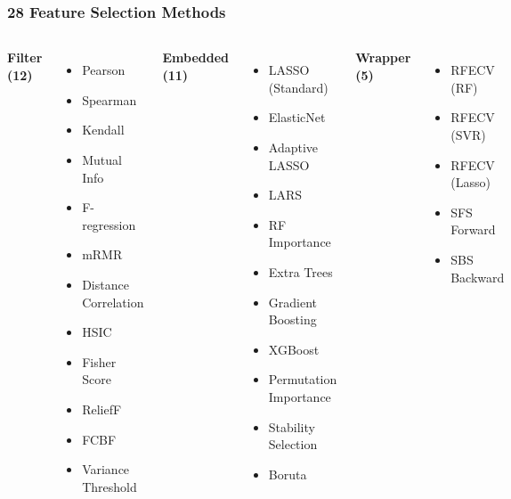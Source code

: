 \documentclass[aspectratio=169]{beamer}
\begin{document}
\begin{frame}
    \frametitle{28 Feature Selection Methods}
    \scriptsize
    \begin{columns}[T]
        \textbf{\textcolor{blue!70!black}{Filter (12)}}
        \begin{itemize}\setlength\itemsep{0em}
            \item Pearson
            \item Spearman
            \item Kendall
            \item Mutual Info
            \item F-regression
            \item mRMR
            \item Distance Correlation
            \item HSIC
            \item Fisher Score
            \item ReliefF
            \item FCBF
            \item Variance Threshold
        \end{itemize}
        \textbf{\textcolor{orange!80!black}{Embedded (11)}}
        \begin{itemize}\setlength\itemsep{0em}
            \item LASSO (Standard)
            \item ElasticNet
            \item Adaptive LASSO
            \item LARS
            \item RF Importance
            \item Extra Trees
            \item Gradient Boosting
            \item XGBoost
            \item Permutation Importance
            \item Stability Selection
            \item Boruta
        \end{itemize}
        \textbf{\textcolor{green!50!black}{Wrapper (5)}}
        \begin{itemize}\setlength\itemsep{0em}
            \item RFECV (RF)
            \item RFECV (SVR)
            \item RFECV (Lasso)
            \item SFS Forward
            \item SBS Backward
        \end{itemize}
    \end{columns}
\end{frame}
\end{document}
